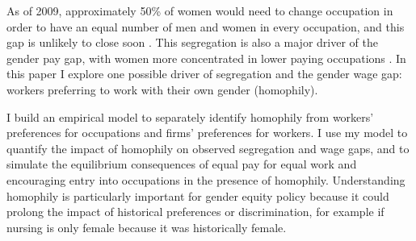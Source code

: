 \documentclass[12pt]{article}
\begin{document}


As of 2009, approximately 50\% of women would need to change occupation in order to have an equal number of men and women in every occupation, and this gap is unlikely to close soon \cite{Blau2013}. This segregation is also a major driver of the gender pay gap, with women more concentrated in lower paying occupations \cite{Blau2017}. In this paper I explore one possible driver of segregation and the gender wage gap: workers preferring to work with their own gender (homophily).



I build an empirical model to separately identify homophily from workers' preferences for occupations and firms' preferences for workers. I use my model to quantify the impact of homophily on observed segregation and wage gaps, and to simulate the equilibrium consequences of equal pay for equal work and encouraging entry into occupations in the presence of homophily. Understanding homophily is particularly important for gender equity policy because it could prolong the impact of historical preferences or discrimination, for example if nursing is only female because it was historically female.
\end{document}
